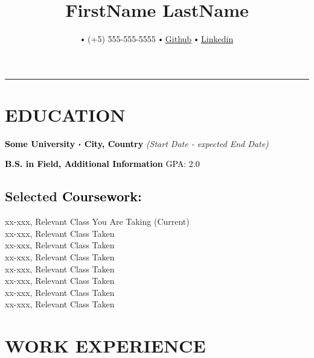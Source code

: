 \documentclass[10pt]{article}
\title{\bfseries\Huge FirstName LastName}
\author{
  \small \myemail
   $\sbullet[.75]$
   (+5) 555-555-5555 %
   $\sbullet[.75]$
  \href{https://github.com/}{Github}
   $\sbullet[.75]$
  \href{https://www.linkedin.com/in/}
{Linkedin}
}
\date{}
\newcommand\sbullet[1][.5]{\mathbin{\vcenter{\hbox{\scalebox{#1}{$\bullet$}}}}}
\begin{document}
  \maketitle
  \thispagestyle{empty}
  \vspace*{-1.0cm}
  \hrule
  \vspace*{-0.15cm}

  \section*{\Large \textcolor{lighterB}{EDUCATION}}
  \vspace*{-0.2cm}  %
  \textbf{\large \textcolor{Black}{Some University $\sbullet$ City, Country}} \hfill \textit{(Start Date - expected End Date)}

  \vspace{0.05cm}

  \textcolor{Black}{\textbf{B.S. in Field, Additional Information} \hfill GPA: 2.0}
  \vspace{0.2cm}

  \vspace*{-0.5cm}

  \subsection*{Selected \textcolor{Black}{Coursework:}}

    \vspace*{-0.55cm}
    \begin{multicols}{2}
       xx-xxx, Relevant Class You Are Taking (Current) \\
       xx-xxx, Relevant Class Taken \\
       xx-xxx, Relevant Class Taken \\
       \columnbreak
       xx-xxx, Relevant Class Taken \\
       xx-xxx, Relevant Class Taken \\
       xx-xxx, Relevant Class Taken \\
       xx-xxx, Relevant Class Taken \\
       xx-xxx, Relevant Class Taken
    \end{multicols}

  \section*{\Large \textcolor{lighterB} {WORK EXPERIENCE}}
  \vspace*{-0.15cm}  %
\end{document}
